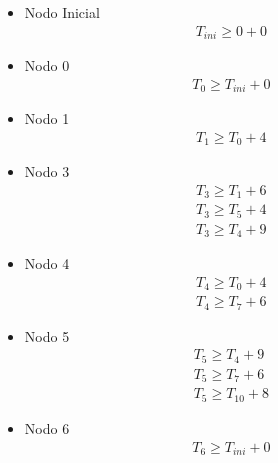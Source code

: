 \begin{itemize}

\item{Nodo Inicial
	\begin{align*}
		T_ {ini} \ge 0 + 0 &         &         &         &         &         &
	\end{align*}}

\item Nodo 0
	\begin{align*}
		T_0 \ge T_{ini} + 0 &         &         &         &         &         &
	\end{align*}


\item Nodo 1
	\begin{align*}
T_1 \ge T_0 + 4 &         &         &         &         &         &
	\end{align*}


\item Nodo 3
\begin{align*}
T_3 \ge T_1 + 6 &         &         &         &         &         &\\
T_3 \ge T_5 + 4 &         &         &         &         &         &\\
T_3 \ge T_4 + 9 &         &         &         &         &         &
	\end{align*}



\item Nodo 4
\begin{align*}
T_4 \ge T_0 + 4 &         &         &         &         &         &\\
T_4 \ge T_7 + 6 &         &         &         &         &         &
	\end{align*}


\item Nodo 5
\begin{align*}
        T_5 \ge T_4 + 9  &         &         &         &         &         &\\
        T_5 \ge T_7 + 6  &         &         &         &         &         &\\
        T_5 \ge T_{10} + 8  &         &         &         &         &         &
	\end{align*}


\item Nodo 6
	\begin{align*}
	T_6 \ge T_{ini} + 0 &         &         &         &         &         &
	\end{align*}


\end{itemize}
